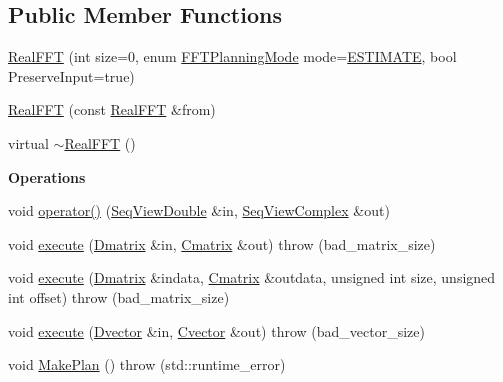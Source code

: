 \subsection*{Public Member Functions}
\begin{DoxyCompactItemize}
\item 
\hyperlink{classtsa_1_1_real_f_f_t_a5da04120c5120c230282a6833b8871ae}{Real\+F\+FT} (int size=0, enum \hyperlink{namespacetsa_a217e07ef78939f88b22c8428ac96b1ae}{F\+F\+T\+Planning\+Mode} mode=\hyperlink{namespacetsa_a217e07ef78939f88b22c8428ac96b1aea2762be66fb6f3e4772c7f4cc162b9750}{E\+S\+T\+I\+M\+A\+TE}, bool Preserve\+Input=true)
\item 
\hyperlink{classtsa_1_1_real_f_f_t_a2c65c00ea09121cceb8804b9d5e1c395}{Real\+F\+FT} (const \hyperlink{classtsa_1_1_real_f_f_t}{Real\+F\+FT} \&from)
\item 
virtual \hyperlink{classtsa_1_1_real_f_f_t_a51eccd426b1802e0c245c8dd4006dc3e}{$\sim$\+Real\+F\+FT} ()
\end{DoxyCompactItemize}
\begin{Indent}\textbf{ Operations}\par
\begin{DoxyCompactItemize}
\item 
void \hyperlink{classtsa_1_1_real_f_f_t_a3bf380302985631f972017262e83be11}{operator()} (\hyperlink{namespacetsa_ac599574bcc094eda25613724b8f3ca9e}{Seq\+View\+Double} \&in, \hyperlink{namespacetsa_ab32775c889b53c40fa83939f22372b75}{Seq\+View\+Complex} \&out)
\item 
void \hyperlink{classtsa_1_1_real_f_f_t_a571915c01137937b542c88c3094b9e50}{execute} (\hyperlink{namespacetsa_ad260cd21c1891c4ed391fe788569aba4}{Dmatrix} \&in, \hyperlink{namespacetsa_a86348fef1603a135fe5fba9e5f5486ee}{Cmatrix} \&out)  throw (bad\+\_\+matrix\+\_\+size)
\item 
void \hyperlink{classtsa_1_1_real_f_f_t_a8315388a35738d3005bc596852500e56}{execute} (\hyperlink{namespacetsa_ad260cd21c1891c4ed391fe788569aba4}{Dmatrix} \&indata, \hyperlink{namespacetsa_a86348fef1603a135fe5fba9e5f5486ee}{Cmatrix} \&outdata, unsigned int size, unsigned int offset)  throw (bad\+\_\+matrix\+\_\+size)
\item 
void \hyperlink{classtsa_1_1_real_f_f_t_a14b6f0098aed4984d7b969f107df5f2b}{execute} (\hyperlink{namespacetsa_a8900fb03d849baf447a1a0efe2561fb2}{Dvector} \&in, \hyperlink{namespacetsa_a054d1045ead95a65819e9e5722baf600}{Cvector} \&out)  throw (bad\+\_\+vector\+\_\+size)
\item 
void \hyperlink{classtsa_1_1_real_f_f_t_a6684b1abf6f9de2d7c546c3556ef0a0e}{Make\+Plan} ()  throw (std\+::runtime\+\_\+error)
\end{DoxyCompactItemize}
\end{Indent}
